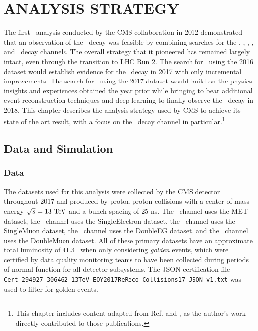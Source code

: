 \chapter{ANALYSIS STRATEGY} \label{strategy}

The first \VHbb\ analysis conducted by the CMS collaboration in 2012\cite{HIG13012} demonstrated that an observation of the \Hbb\ decay was feasible by combining searches for the \ZnnHbb, \WenHbb, \WmnHbb, \ZeeHbb, and \ZmmHbb\ decay channels. The overall strategy that it pioneered has remained largely intact, even through the transition to LHC Run 2. The search for \VHbb\ using the 2016 dataset would establish evidence for the \Hbb\ decay in 2017\cite{CMSVHbbEvidence} with only incremental improvements. The search for \VHbb\ using the 2017 dataset would build on the physics insights and experiences obtained the year prior while bringing to bear additional event reconstruction techniques and deep learning to finally observe the \Hbb\ decay in 2018.\cite{HIG18016} This chapter describes the analysis strategy used by CMS to achieve its state of the art result, with a focus on the \ZnnHbb\ decay channel in particular.\footnote{This chapter includes content adapted from Ref. \cite{CMSVHbbEvidence} and \cite{HIG18016}, as the author's work directly contributed to those publications.}

\section{Data and Simulation}

\subsection{Data}

The datasets used for this analysis were collected by the CMS detector throughout 2017 and produced by proton-proton collisions with a center-of-mass energy $\sqrt{s} = 13\ \TeV$ and a bunch spacing of 25 ns. The \ZnnH\ channel uses the MET dataset, the \WenH\ channel uses the SingleElectron dataset, the \WmnH\ channel uses the SingleMuon dataset, the \ZeeH\ channel uses the DoubleEG dataset, and the \ZmmH\ channel uses the DoubleMuon dataset. All of these primary datasets have an approximate total luminosity of 41.3 \invfb\ when only considering \textit{golden} events, which were certified by data quality monitoring teams to have been collected during periods of normal function for all detector subsystems. The JSON certification file \texttt{Cert\_294927-306462\_13TeV\_EOY2017ReReco\_Collisions17\_JSON\_v1.txt} was used to filter for golden events.

